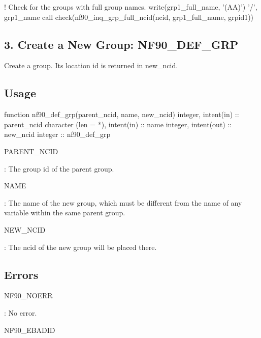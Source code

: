 \begin{DoxyCode}
\textcolor{comment}{! Check for the groups with full group names.}
\textcolor{keyword}{write}(grp1\_full\_name, \textcolor{stringliteral}{'(AA)'}) \textcolor{stringliteral}{'/'}, grp1\_name
\textcolor{keyword}{call }check(nf90\_inq\_grp\_full\_ncid(ncid, grp1\_full\_name, grpid1))
\end{DoxyCode}
\hypertarget{f90_groups_f90-create-a-new-group-nf90_def_grp}{}\subsection{3. Create a New Group\+: N\+F90\+\_\+\+D\+E\+F\+\_\+\+G\+R\+P }\label{f90_groups_f90-create-a-new-group-nf90_def_grp}
Create a group. Its location id is returned in new\+\_\+ncid.

\subsection*{Usage}


\begin{DoxyCode}
\textcolor{keyword}{function }nf90\_def\_grp(parent\_ncid, name, new\_ncid)
  \textcolor{keywordtype}{integer}, \textcolor{keywordtype}{intent(in)} :: parent\_ncid
  \textcolor{keywordtype}{character (len = *)}, \textcolor{keywordtype}{intent(in)} :: name
  \textcolor{keywordtype}{integer}, \textcolor{keywordtype}{intent(out)} :: new\_ncid
  \textcolor{keywordtype}{integer} :: nf90\_def\_grp
\end{DoxyCode}


{\ttfamily P\+A\+R\+E\+N\+T\+\_\+\+N\+C\+ID}

\+: The group id of the parent group.

{\ttfamily N\+A\+ME}

\+: The name of the new group, which must be different from the name of any variable within the same parent group.

{\ttfamily N\+E\+W\+\_\+\+N\+C\+ID}

\+: The ncid of the new group will be placed there.

\subsection*{Errors}

{\ttfamily N\+F90\+\_\+\+N\+O\+E\+RR}

\+: No error.

{\ttfamily N\+F90\+\_\+\+E\+B\+A\+D\+ID}

